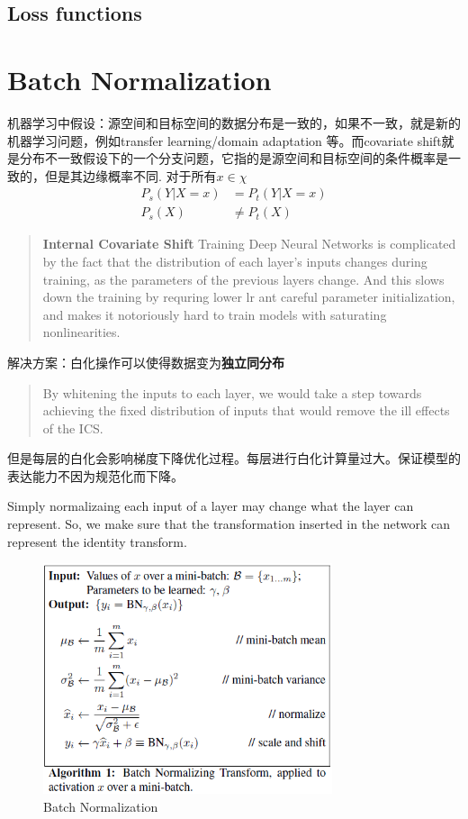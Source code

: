 \subsection{Loss functions}


\section{Batch Normalization}
机器学习中假设：源空间和目标空间的数据分布是一致的，如果不一致，就是新的机器学习问题，例如transfer learning/domain adaptation
等。而covariate shift就是分布不一致假设下的一个分支问题，它指的是源空间和目标空间的条件概率是一致的，但是其边缘概率不同.
对于所有$x \in \chi $
\begin{equation}
    \begin{split}
        P_s(Y|X = x) &= P_t(Y|X = x) \\
        P_s(X) &\neq P_t(X)
    \end{split}
\end{equation}
\begin{quotation}
    \textbf{Internal Covariate Shift} Training Deep Neural Networks is complicated by the fact that the distribution of each layer's inputs
changes during training, as the parameters of the previous layers change. And this slows down the training
by requring lower lr ant careful parameter initialization, and makes it notoriously hard to train models
with saturating nonlinearities.
\end{quotation}
解决方案：白化操作可以使得数据变为\textbf{独立同分布}
\begin{quotation}
    By whitening the inputs to each layer, we would take a step towards achieving the fixed distribution
    of inputs that would remove the ill effects of the ICS.
\end{quotation}
但是每层的白化会影响梯度下降优化过程。每层进行白化计算量过大。保证模型的表达能力不因为规范化而下降。

Simply normalizaing each input of a layer may change what the layer can represent. So, we make sure that
the transformation inserted in the network can represent the identity transform.
\begin{figure}[H]
    \centering
    \includegraphics[width=8.5cm]{images/bn_algorithm.png}
    \caption{Batch Normalization}
    \label{fig:batchnorm}
\end{figure}

